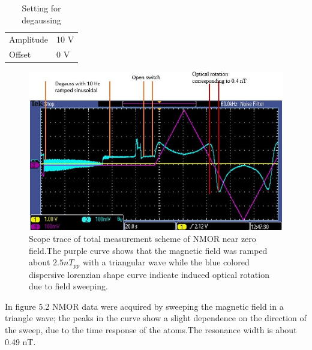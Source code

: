\begin{itemize}
\begin{table}[h]
\begin{tabular}{|l |l|}
Amplitude   &  10 V \\
Offset  &       0 V  \\
\hline
\end{tabular}
\caption{Setting for degaussing }
\end{table}
     \begin{figure}[h]
 \centering\includegraphics[width=0.7\linewidth]{figures/scope_trace_of_field_sweeping}
\caption{Scope trace of total measurement scheme of NMOR near zero field.The purple curve shows that the magnetic field was ramped about $ 2.5 nT_{pp}$ with a triangular wave while the blue colored dispersive lorenzian shape curve indicate induced optical rotation due to field sweeping. }
\end{figure}
\newpage
In figure 5.2 NMOR data were acquired by sweeping the magnetic field in a triangle wave; the peaks in the curve show a slight dependence on the direction of the sweep, due to the time response of the atoms.The resonance width is about 0.49 nT.


\end{itemize}
